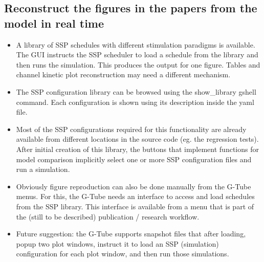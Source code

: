 \documentclass[12pt]{article}
\begin{document}
\subsection{Reconstruct the figures in the papers from the model in real time}

\begin{itemize}
\item A library of SSP schedules with different stimulation paradigms
  is available.  The GUI instructs the SSP scheduler to load a
  schedule from the library and then runs the simulation.  This
  produces the output for one figure.  Tables and channel kinetic plot
  reconstruction may need a different mechanism.
\item The SSP configuration library can be browsed using the
  show\_library gshell command.  Each configuration is shown using its
  description inside the yaml file.
\item Most of the SSP configurations required for this functionality
  are already available from different locations in the source code
  (eg. the regression tests).  After initial creation of this library,
  the buttons that implement functions for model comparison implicitly
  select one or more SSP configuration files and run a simulation.
\item Obviously figure reproduction can also be done manually from the
  G-Tube menus.  For this, the G-Tube needs an interface to access and
  load schedules from the SSP library.  This interface is available
  from a menu that is part of the (still to be described) publication
  / research workflow.
\item Future suggestion: the G-Tube supports snapshot files that after
  loading, popup two plot windows, instruct it to load an SSP
  (simulation) configuration for each plot window, and then run those
  simulations.
\end{itemize}




\end{document}
